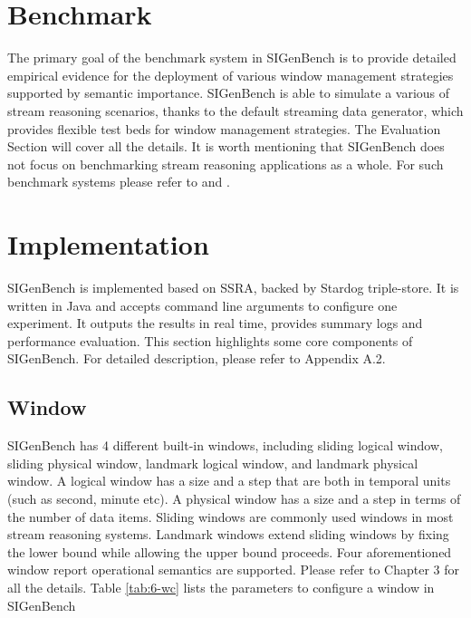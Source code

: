 \section{Benchmark}
The primary goal of the benchmark system in SIGenBench is to provide detailed empirical evidence for the deployment of various window management strategies supported by semantic importance.
SIGenBench is able to simulate a various of stream reasoning scenarios, thanks to the default streaming data generator, which provides flexible test beds for window management strategies.
The Evaluation Section will cover all the details.
It is worth mentioning that SIGenBench does not focus on benchmarking stream reasoning applications as a whole.
For such benchmark systems please refer to \cite{dell2013correctness} \cite{ali2015citybench} \cite{tommasini2015heaven} and \cite{benchmarkdemo}.
%
\section{Implementation}
SIGenBench is implemented based on SSRA, backed by Stardog triple-store.
It is written in Java and accepts command line arguments to configure one experiment. 
It outputs the results in real time, provides summary logs and performance evaluation.
This section highlights some core components of SIGenBench. 
For detailed description, please refer to Appendix A.2.
%
\subsection{Window}
SIGenBench has 4 different built-in windows, including sliding logical window, sliding physical window, landmark logical window, and landmark physical window. 
A logical window has a size and a step that are both in temporal units (such as second, minute etc).
A physical window has a size and a step in terms of the number of data items. 
Sliding windows are commonly used windows in most stream reasoning systems. 
Landmark windows extend sliding windows by fixing the lower bound while allowing the upper bound proceeds.
Four aforementioned window report operational semantics are supported.
Please refer to Chapter 3 for all the details. 
Table \ref{tab:6-wc} lists the parameters to configure a window in SIGenBench

